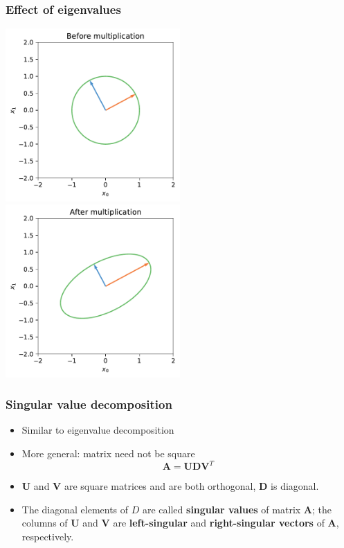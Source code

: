 \documentclass[notes]{beamer}          %
\newcommand{\vect}[1]{\bm{#1}}
\begin{document}
\begin{frame}
\frametitle{Effect of eigenvalues}

\begin{center}
\includegraphics[width=0.5\textwidth]{figures/week_1/unit_circle_before.pdf}
\hfill
\includegraphics[width=0.5\textwidth]{figures/week_1/unit_circle_after.pdf}
\end{center}

\end{frame}


\begin{frame}
\frametitle{Singular value decomposition}
    \begin{itemize}
        \item Similar to eigenvalue decomposition
        \item More general: matrix need not be square
        $$\vect{A} = \vect{U} \vect{D} \vect{V}^T$$
        \item $\vect{U}$ and $\vect{V}$ are square matrices and are both orthogonal, $\vect{D}$ is diagonal.
        \item The diagonal elements of $D$ are called {\bf singular values} of matrix $\vect{A}$; the columns of $\vect{U}$ and $\vect{V}$ are {\bf left-singular} and {\bf right-singular vectors} of $\vect{A}$, respectively.
    \end{itemize}

\end{frame}
\end{document}

